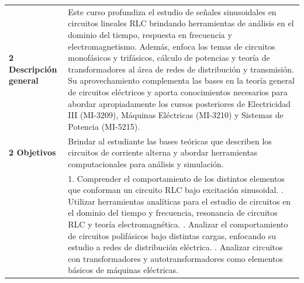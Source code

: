 \documentclass[letterpaper]{article}%
\begin{document}
\newpage%
\renewcommand{\arraystretch}{1.5}%
\begin{longtable}{p{}p{}}%
\par\fontsize{12}{0}\selectfont \textbf{\textcolor{parte}{2 Descripción general}}&Este curso profundiza el estudio de señales sinusoidales en circuitos lineales RLC brindando herramientas de análisis en el dominio del tiempo, respuesta en frecuencia y electromagnetismo. Además, enfoca los temas de circuitos monofásicos y trifásicos, cálculo de potencias y teoría de transformadores al área de redes de distribución y transmisión. Su aprovechamiento complementa las bases en la teoría general de circuitos eléctricos y aporta conocimientos necesarios para abordar apropiadamente los cursos posteriores de Electricidad III (MI{-}3209), Máquinas Eléctricas (MI{-}3210) y Sistemas de Potencia (MI{-}5215).\\%
\par\fontsize{12}{0}\selectfont \textbf{\textcolor{parte}{2 Objetivos}}&Brindar al estudiante las bases teóricas que describen los circuitos de corriente alterna y
\newline%
abordar herramientas computacionales para análisis y simulación.\\%
&1. Comprender el comportamiento de los distintos elementos que conforman un circuito RLC bajo excitación sinusoidal.
\newline%
     2. Utilizar herramientas analíticas para el estudio de circuitos en el dominio del tiempo y frecuencia, resonancia de circuitos RLC y teoría electromagnética.
\newline%
     3. Analizar el comportamiento de circuitos polifásicos bajo distintas cargas, enfocando su estudio a redes de distribución eléctrica. 
\newline%
    4. Analizar circuitos con transformadores y autotransformadores como elementos básicos de máquinas eléctricas.\\%
\end{longtable}%
\end{document}
